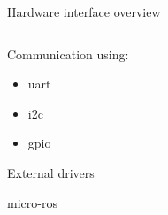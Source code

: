 
\begin{frame}{Hardware interface overview}

	\begin{columns}[T]
		\begin{column}{0.5\textwidth}

			Communication using:
			\begin{itemize}
				\item \acf{uart}
				\item \acf{i2c}
				\item \acf{gpio}
			\end{itemize}

			External drivers

			\acs{micro-ros}

		\end{column}
		\begin{column}{0.5\textwidth}

			\begin{adjustbox}{scale=0.7,center,margin={-1cm,3cm,2cm,0cm}}
				
			\end{adjustbox}

		\end{column}
	\end{columns}

\end{frame}


